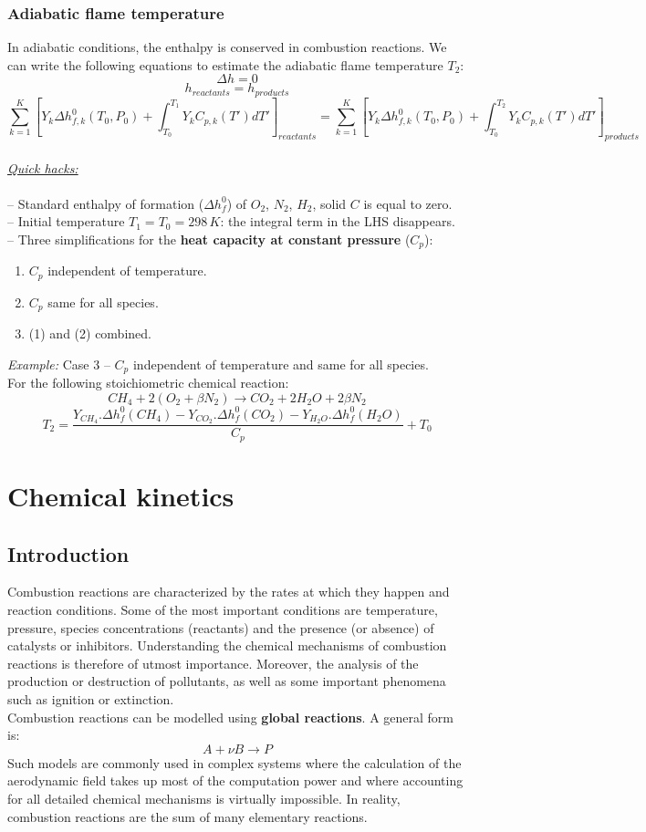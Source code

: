 \documentclass[a4paper,11pt]{article}
\begin{document}
\subsubsection{Adiabatic flame temperature}
In adiabatic conditions, the enthalpy is conserved in combustion reactions. We can write the following equations to estimate the adiabatic flame temperature $T_2$:
\[\Delta h = 0\]
\[h_{reactants} = h_{products}\]
\[\sum^{K}_{k=1}[Y_k\Delta h^0_{f,k}(T_0,P_0)+\int_{T_0}^{T_1}Y_kC_{p,k}(T')dT']_{reactants} = \sum^{K}_{k=1}[Y_k\Delta h^0_{f,k}(T_0,P_0)+\int_{T_0}^{T_2}Y_kC_{p,k}(T')dT']_{products}\]\\
\noindent
\emph{\underline{Quick hacks:}}\\ \\
-- Standard enthalpy of formation ($\Delta h_f^0$) of $O_2$, $N_2$, $H_2$, solid $C$ is equal to zero.\\
-- Initial temperature $T_1=T_0=298\,K$: the integral term in the LHS disappears.
\\
-- Three simplifications for the \textbf{heat capacity at constant pressure} ($C_p$):
\begin{enumerate}
    \item $C_p$ independent of temperature.
    \item $C_p$ same for all species.
    \item (1) and (2) combined.
\end{enumerate}
\emph{Example:} Case 3 -- $C_p$ independent of temperature and same for all species.\\
For the following stoichiometric chemical reaction:
\[CH_4+2(O_2+\beta N_2) \rightarrow CO_2 + 2 H_2O +2\beta N_2\]
\[T_2 = \frac{Y_{CH_4}.\Delta h_f^0(CH_4)
- Y_{CO_2}.\Delta h_f^0(CO_2)
- Y_{H_2O}.\Delta h_f^0(H_2O)}
{C_p}+T_0
\]








\pagebreak
\section{Chemical kinetics}
\subsection{Introduction}
Combustion reactions are characterized by the rates at which they happen and reaction conditions. Some of the most important conditions are temperature, pressure, species concentrations (reactants) and the presence (or absence) of catalysts or inhibitors. Understanding the chemical mechanisms of combustion reactions is therefore of utmost importance. Moreover, the analysis of the production or destruction of pollutants, as well as some important phenomena such as ignition or extinction.\\
Combustion reactions can be modelled using \textbf{global reactions}. A general form is:
\[A + \nu B \rightarrow P\]
Such models are commonly used in complex systems where the calculation of the aerodynamic field takes up most of the computation power and where accounting for all detailed chemical mechanisms is virtually impossible. In reality, combustion reactions are the sum of many elementary reactions.
\end{document}
